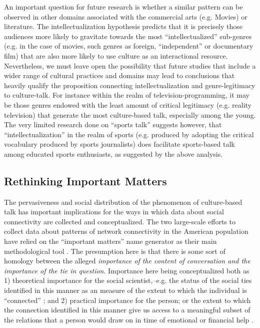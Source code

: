 \documentclass[11pt]{article}
\begin{document}
An important question for future research is whether a similar pattern can be observed in other domains associated with the commercial arts (e.g. Movies) or literature. The intellectualization hypothesis predicts that it is precisely those audiences more likely to gravitate towards the most ``intellectualized'' sub-genres (e.g.  in the case of movies, such genres as foreign, ``independent'' or documentary film) that are also more likely to use culture as an interactional resource.    Nevertheless, we must leave open the possibility that future studies that include a wider range of cultural practices and domains may lead to conclusions that heavily qualify the proposition connecting intellectualization and genre-legitimacy to culture-talk.  For instance within the realm of television-programming, it may be those genres endowed with the least amount of critical legitimacy (e.g. reality television) that generate the most culture-based talk, especially among the young.  The very limited research done on ``sports talk'' \citep{purcell07} suggests however, that ``intellectualization'' in the realm of sports (e.g. produced by adopting the critical vocabulary produced by sports journalists) does facilitate sports-based talk among educated sports enthusiasts, as suggested by the above analysis. 
 
\subsection{Rethinking Important Matters}
The pervasiveness and social distribution of the phenomenon of culture-based talk has important implications for the ways in which data about social connectivity are collected and conceptualized.  The two large-scale efforts to collect data about patterns of network connectivity in the American population have relied on the ``important matters'' name generator as their main methodological tool \citep{burt84, marsden87, mcpherson_etal06}. The presumption here is that there is some sort of homology between the alleged \emph{importance of the content of conversation and the importance of the tie in question}.  Importance here being conceptualized both as 1) theoretical importance for the social scientist,--e.g. the status of the social ties identified in this manner as an measure of the extent to which the individual is ``connected'' \citep{burt90}; and 2) practical importance for the person; or the extent to which the connection identified in this manner give us access to a meaningful subset of the relations that a person would draw on in time of emotional or financial help \citep{wellman_wortley90}.
\end{document}
